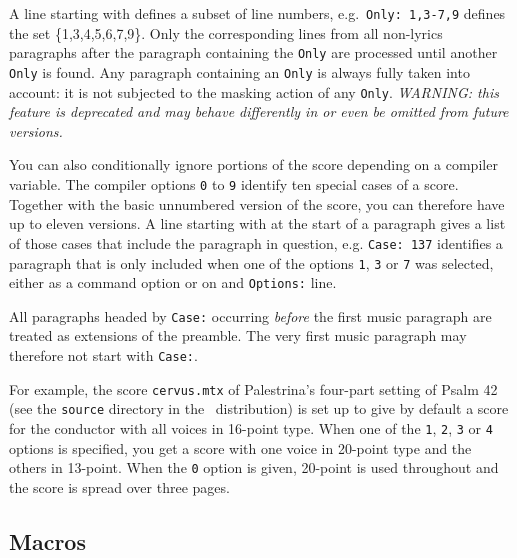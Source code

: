 \documentclass[11pt]{article}
\begin{document}
A line starting with  defines a subset of line numbers, 
e.g.~\verb"Only: 1,3-7,9" defines the set \{1,3,4,5,6,7,9\}.  Only 
the corresponding lines from all non-lyrics paragraphs after the paragraph 
containing the \texttt{Only} are processed until another \texttt{Only} is 
found.  Any paragraph containing an \texttt{Only} is always fully taken into 
account: it is not subjected to the masking action of any \texttt{Only}. 
\emph{WARNING: this feature is deprecated and may behave differently in 
or even be omitted from future versions.}

You can also conditionally ignore portions of the score depending on a 
compiler variable.   The compiler options \texttt{0} to \texttt{9} 
identify ten special cases of a score.  Together with the basic unnumbered 
version of the score, you can therefore have up to eleven versions. A line 
starting with  at the start of a paragraph gives a list of those 
cases that include the paragraph in question,  e.g. \verb"Case: 137" 
identifies a paragraph that is only included when one of the options 
\texttt{1}, \texttt{3} or \texttt{7} was selected, either as a command option 
or on and \texttt{Options:} line.  

All paragraphs headed by \texttt{Case:} occurring \emph{before} the first 
music paragraph are treated as extensions of the preamble.  The very first 
music paragraph may therefore not start with \texttt{Case:}. 

For example, the score \texttt{cervus.mtx} of Palestrina's four-part
setting of Psalm 42 (see the \texttt{source} directory in the \MTx\
distribution) is set up to give by default a score for the conductor with all 
voices in 16-point type.   When one of the \texttt{1}, \texttt{2}, \texttt{3} 
or \texttt{4} options is specified, you get a score with one voice in 20-point 
type and the others in 13-point.  When the \texttt{0} option is given, 
20-point is used throughout and the score is spread over three pages. 


\subsection{Macros}  
\end{document}

